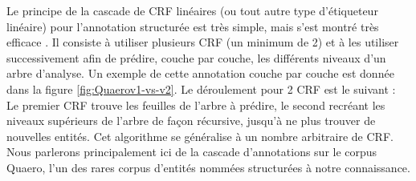 \documentclass[PhD-Yoann-Dupont.tex]{subfiles}
\begin{document}
Le principe de la cascade de CRF linéaires (ou tout autre type d'étiqueteur linéaire) pour l'annotation structurée est très simple, mais s'est montré très efficace \citep{ratnaparkhi1997linear,Tsuruoka09}. Il consiste à utiliser plusieurs CRF (un minimum de 2) et à les utiliser successivement afin de prédire, couche par couche, les différents niveaux d'un arbre d'analyse. Un exemple de cette annotation couche par couche est donnée dans la figure \ref{fig:Quaerov1-vs-v2}. Le déroulement pour 2 CRF est le suivant : Le premier CRF trouve les feuilles de l'arbre à prédire, le second recréant les niveaux supérieurs de l'arbre de façon récursive, jusqu'à ne plus trouver de nouvelles entités. Cet algorithme se généralise à un nombre arbitraire de CRF. Nous parlerons principalement ici de la cascade d'annotations sur le corpus Quaero, l'un des rares corpus d'entités nommées structurées à notre connaissance.
\end{document}
